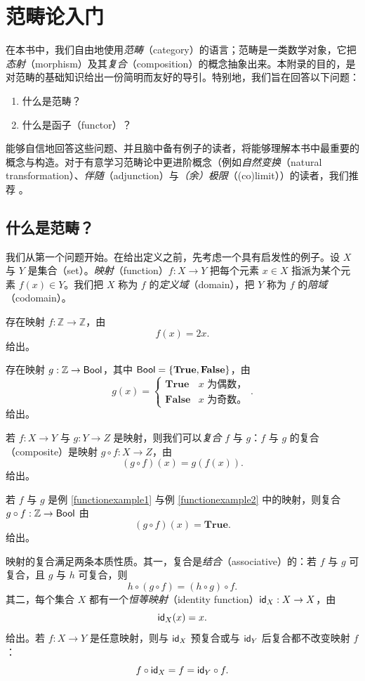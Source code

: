 \chapter{范畴论入门}\label{categorytheoryappendix}

在本书中，我们自由地使用\emph{范畴}（category）的语言；范畴是一类数学对象，它把{\it 态射}（morphism）及其{\it 复合}（composition）的概念抽象出来。本附录的目的，是对范畴的基础知识给出一份简明而友好的导引。特别地，我们旨在回答以下问题：
\begin{enumerate}
    \item 什么是范畴？
    \item 什么是函子（functor）？
\end{enumerate}
能够自信地回答这些问题、并且脑中备有例子的读者，将能够理解本书中最重要的概念与构造。对于有意学习范畴论中更进阶概念（例如{\it 自然变换}（natural transformation）、{\it 伴随}（adjunction）与{\it （余）极限}（(co)limit））的读者，我们推荐 \cite{categoriesfortheworkingmathematician}。

\section{什么是范畴？}
我们从第一个问题开始。在给出定义之前，先考虑一个具有启发性的例子。设 $X$ 与 $Y$ 是集合（set）。{\it 映射}（function）$f:X \to Y$ 把每个元素 $x \in X$ 指派为某个元素 $f(x) \in Y$。我们把 $X$ 称为 $f$ 的{\it 定义域}（domain），把 $Y$ 称为 $f$ 的{\it 陪域}（codomain）。

\begin{example}\label{functionexample1} 存在映射 $f:\mathbb{Z} \to \mathbb{Z}$，由
\[
f(x) = 2x.
\]
给出。
\end{example}
\begin{example}\label{functionexample2} 存在映射 $g:\mathbb{Z} \to \mathsf{Bool}$，其中 $\mathsf{Bool} = \{\mathbf{True},\mathbf{False}\}$，由
\[
g(x) = \begin{cases}\mathbf{True} & x \text{ 为偶数，}\\
\mathbf{False} & x \text{ 为奇数。}
\end{cases}.
\]
给出。
\end{example}
若 $f:X \to Y$ 与 $g:Y \to Z$ 是映射，则我们可以{\it 复合} $f$ 与 $g$：$f$ 与 $g$ 的复合（composite）是映射 $g \circ f:X \to Z$，由
\[
(g \circ f)(x) = g(f(x)).
\]
给出。
\begin{example}若 $f$ 与 $g$ 是例 \ref{functionexample1} 与例 \ref{functionexample2} 中的映射，则复合 $g \circ f:\mathbb{Z} \to \mathsf{Bool}$ 由
\[
(g \circ f)(x) = \mathbf{True}.
\]
给出。
\end{example}
映射的复合满足两条本质性质。其一，复合是{\it 结合}（associative）的：若 $f$ 与 $g$ 可复合，且 $g$ 与 $h$ 可复合，则
    \[
    h \circ (g \circ f) = (h \circ g) \circ f.
    \]
其二，每个集合 $X$ 都有一个{\it 恒等映射}（identity function）$\mathsf{id}_X:X \to X$，由
    \[\mathsf{id}_X(x) = x.\]
    给出。若 $f:X \to Y$ 是任意映射，则与 $\mathsf{id}_X$ 预复合或与 $\mathsf{id}_Y$ 后复合都不改变映射 $f$：
    \[
    f \circ \mathsf{id}_X = f = \mathsf{id}_Y \circ f.
    \]

